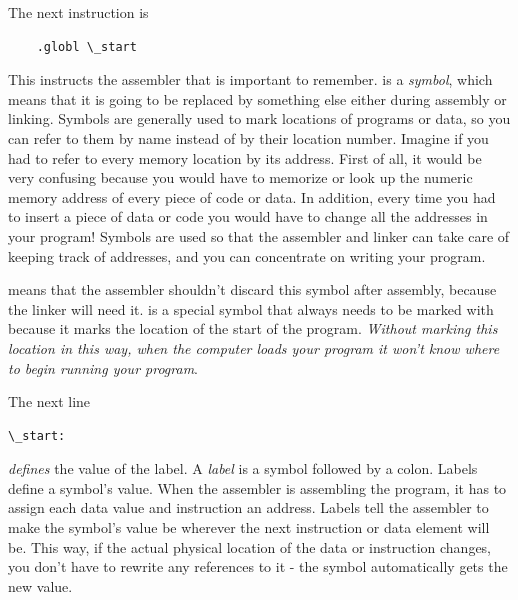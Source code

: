 The next instruction is

\begin{simpletyping}
\begin{lstlisting}
	.globl \_start
\end{lstlisting}
\end{simpletyping}

This instructs the assembler that  is important
to remember.   is a \emph{symbol},
which means that it is going to be replaced by something else either
during assembly or linking.  Symbols are generally used to mark locations
of programs or data, so you can refer to them by name instead of by their
location number.  Imagine if you had to refer to every memory location
by its address.  First of all, it would be very confusing because you would
have to memorize or look up the numeric memory address of every piece of code
or data.  In addition, every time you had to insert a piece of data or
code you would have to change all the addresses in your program!  
Symbols are used so that the assembler and linker can take care of
keeping track of addresses, and you can concentrate on writing your
program.

 means that the assembler shouldn't
discard this symbol after assembly, because the linker will need it.  
 is a special symbol that always needs to be 
marked with  because it marks the location of the
start of the program.  \emph{Without marking this 
location in this way, when the computer loads your program it won't know 
where to begin running your program}.

The next line

\begin{simpletyping}
\begin{lstlisting}
\_start:
\end{lstlisting}
\end{simpletyping}

\emph{defines} the value of the  label. A \emph{label} 
is a symbol followed by
a colon.  Labels define a symbol's value.  When the 
assembler is assembling
the program, it has to assign each data value and instruction an address.
Labels tell the assembler to make the symbol's value be wherever the
next instruction or data element will be.  This way, if the actual
physical location of the data or instruction changes, you don't have to
rewrite any references to it - the symbol automatically gets the new value.

